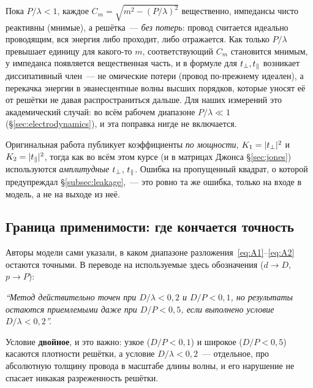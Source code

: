 \begin{strict}
Пока $P/\lambda<1$, каждое $C_m=\sqrt{m^2-(P/\lambda)^2}$ вещественно, импедансы чисто реактивны
(мнимые), а решётка~--- \emph{без потерь}: провод считается идеально проводящим, вся энергия либо
проходит, либо отражается. Как только $P/\lambda$ превышает единицу для какого-то $m$, соответствующий
$C_m$ становится мнимым, у импеданса появляется вещественная часть, и в формуле для $t_{\perp},t_{\parallel}$
возникает диссипативный член~--- не омические потери (провод по-прежнему идеален), а перекачка
энергии в эванесцентные волны высших порядков, которые уносят её от решётки не давая
распространиться дальше. Для наших измерений это академический случай: во всём рабочем диапазоне
$P/\lambda\ll1$ (§\ref{sec:electrodynamics}), и эта поправка нигде не включается.
\end{strict}

\begin{warning}
Оригинальная работа публикует коэффициенты \emph{по мощности}, $K_1=|t_{\perp}|^2$ и
$K_2=|t_{\parallel}|^2$, тогда как во всём этом курсе (и в матрицах Джонса §\ref{sec:jones}) используются
\emph{амплитудные} $t_{\perp}$, $t_{\parallel}$. Ошибка на пропущенный квадрат, о которой предупреждал
§\ref{subsec:leakage},~--- это ровно та же ошибка, только на входе в модель, а не на выходе из
неё.
\end{warning}

\subsection{Граница применимости: где кончается точность}
\label{subsec:validity}

Авторы модели сами указали, в каком диапазоне разложения~\eqref{eq:A1}--\eqref{eq:A2} остаются
точными. В переводе на используемые здесь обозначения ($d\to D$, $p\to P$):

\begin{tcolorbox}[enhanced,colback=white,colframe=cAccent,boxrule=0.8pt,arc=1pt,left=10pt,right=10pt]
\itshape ``Метод действительно точен при $D/\lambda<0{,}2$ и $D/P<0{,}1$, но результаты остаются
приемлемыми даже при $D/P<0{,}5$, если выполнено условие $D/\lambda<0{,}2$''.
\end{tcolorbox}

Условие \textbf{двойное}, и это важно: узкое ($D/P<0{,}1$) и широкое ($D/P<0{,}5$) касаются
плотности решётки, а условие $D/\lambda<0{,}2$~--- отдельное, про абсолютную толщину провода в
масштабе длины волны, и его нарушение не спасает никакая разреженность решётки.

